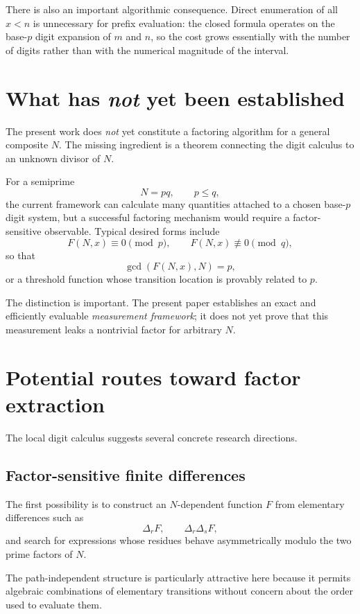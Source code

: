 \documentclass[11pt,a4paper]{article}
\theoremstyle{definition}
\theoremstyle{remark}
\begin{document}
There is also an important algorithmic consequence.  Direct enumeration of all $x<n$ is unnecessary for prefix evaluation: the closed formula operates on the base-$p$ digit expansion of $m$ and $n$, so the cost grows essentially with the number of digits rather than with the numerical magnitude of the interval.

\section{What has \emph{not} yet been established}

The present work does \emph{not} yet constitute a factoring algorithm for a general composite $N$.  The missing ingredient is a theorem connecting the digit calculus to an unknown divisor of $N$.

For a semiprime
\[
 N=pq,
 \qquad p\le q,
\]
the current framework can calculate many quantities attached to a chosen base-$p$ digit system, but a successful factoring mechanism would require a factor-sensitive observable.  Typical desired forms include
\[
 F(N,x)\equiv0\pmod p,
 \qquad
 F(N,x)\not\equiv0\pmod q,
\]
so that
\[
 \gcd(F(N,x),N)=p,
\]
or a threshold function whose transition location is provably related to $p$.

The distinction is important.  The present paper establishes an exact and efficiently evaluable \emph{measurement framework}; it does not yet prove that this measurement leaks a nontrivial factor for arbitrary $N$.

\section{Potential routes toward factor extraction}

The local digit calculus suggests several concrete research directions.

\subsection{Factor-sensitive finite differences}

The first possibility is to construct an $N$-dependent function $F$ from elementary differences such as
\[
 \Delta_rF,
 \qquad
 \Delta_r\Delta_sF,
\]
and search for expressions whose residues behave asymmetrically modulo the two prime factors of $N$.

The path-independent structure is particularly attractive here because it permits algebraic combinations of elementary transitions without concern about the order used to evaluate them.
\end{document}
